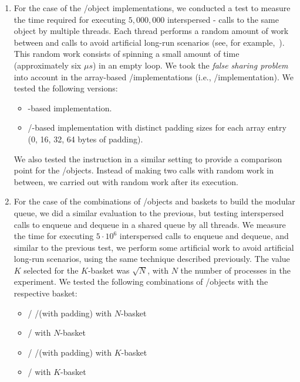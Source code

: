 \begin{enumerate}
    \item For the case of the \LL/\IC object implementations, we conducted a test to measure the time required for executing \(5,000,000\) interspersed \LL - \IC calls to the same object by multiple threads. Each thread performs a random amount of work between \LL and \IC calls to avoid artificial long-run scenarios (see, for example,~\cite {DBLP_conf_ppopp_YangM16}). This random work consists of spinning a small amount of time (approximately six \(\mu{}s\)) in an empty loop. We took the \textit{false sharing problem}~\cite{BoloskyMichael93} into account in the array-based \LL/\IC implementations (i.e., \R/\W implementation). We tested the following versions:

    \begin{itemize}
        \item \CAS-based implementation.
        \item \R/\W-based implementation with distinct padding sizes for each array entry (0, 16, 32, 64 bytes of padding).
        \end{itemize}

We also tested the \FAI instruction in a similar setting to provide a comparison point for the \LL/\IC objects. Instead of making two calls with random work in between, we carried out \FAI with random work after its execution.

\item For the case of the combinations of \LL/\IC objects and baskets to build the modular queue, we did a similar evaluation to the previous, but testing interspersed calls to enqueue and dequeue in a shared queue by all threads. We measure the time for executing \(5\cdot 10^6\) interspersed calls to enqueue and dequeue, and similar to the previous test, we perform some artificial work to avoid artificial long-run scenarios, using the same technique described previously. The value \(K\) selected for the \(K\)-basket was \(\sqrt{N}\), with \(N\) the number of processes in the experiment. We tested the following combinations of \LL/\IC objects with the respective basket:
    \begin{itemize}
        \item \LL/\IC{} \R/\W (with padding) with \(N\)-basket
        \item \LL/\IC{} \CAS with \(N\)-basket
        \item \LL/\IC{} \R/\W (with padding) with \(K\)-basket
        \item \LL/\IC{} \CAS with \(K\)-basket
    \end{itemize}
  \end{enumerate}

